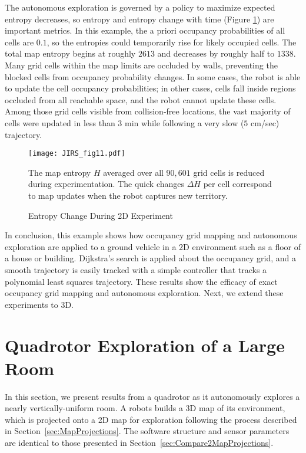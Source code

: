 The autonomous exploration is governed by a policy to maximize expected entropy decreases, so entropy and entropy change with time (Figure \ref{fig:ExperimentH}) are important metrics. In this example, the a priori occupancy probabilities of all cells are $0.1$, so the entropies could temporarily rise for likely occupied cells. The total map entropy begins at roughly $2613$ and decreases by roughly half to $1338$. Many grid cells within the map limits are occluded by walls, preventing the blocked cells from occupancy probability changes. In some cases, the robot is able to update the cell occupancy probabilities; in other cases, cells fall inside regions occluded from all reachable space, and the robot cannot update these cells. Among those grid cells visible from collision-free locations, the vast majority of cells were updated in less than $3$ min while following a very slow ($5$ cm/sec) trajectory.

\begin{figure}
	\centering
	\texttt{[image: JIRS\_fig11.pdf]}
	\caption{Entropy Change During 2D Experiment}
	\medskip
	\small
	The map entropy $H$ averaged over all $90,601$ grid cells is reduced during experimentation. The quick changes $\Delta H$ per cell correspond to map updates when the robot captures new territory.
	\label{fig:ExperimentH}
\end{figure}

In conclusion, this example shows how occupancy grid mapping and autonomous exploration are applied to a ground vehicle in a 2D environment such as a floor of a house or building. Dijkstra's search is applied about the occupancy grid, and a smooth trajectory is easily tracked with a simple controller that tracks a polynomial least squares trajectory. These results show the efficacy of exact occupancy grid mapping and autonomous exploration. Next, we extend these experiments to 3D.




\section{Quadrotor Exploration of a Large Room}
\label{sec:QuadrotorNRL}


In this section, we present results from a quadrotor as it autonomously explores a nearly vertically-uniform room. A robots builds a 3D map of its environment, which is projected onto a 2D map for exploration following the process described in Section~\ref{sec:MapProjections}. The software structure and sensor parameters are identical to those presented in Section~\ref{sec:Compare2MapProjections}.

